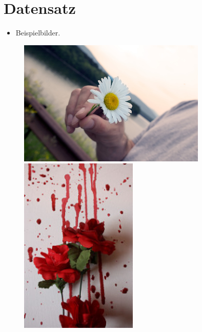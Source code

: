 \documentclass[t]{beamer}
\begin{document}
\section{Datensatz}
\begin{frame}
    \begin{itemize}
        \item Beispielbilder.
    \end{itemize}
    \begin{figure}
        \centering
        \begin{minipage}{0.4\textwidth}
            \centering
            \includegraphics[width=0.8\textwidth]{./teach-plots/dandelion.jpg} %
        \end{minipage}\hfill
        \begin{minipage}{0.4\textwidth}
            \centering
            \includegraphics[width=0.5\textwidth]{./teach-plots/rose.jpg} %
        \end{minipage}

\end{figure}
\end{frame}
\end{document}
